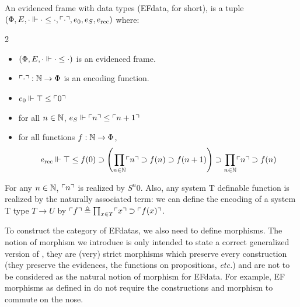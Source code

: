 \documentclass[a4paper,UKenglish,cleveref, autoref, thm-restate]{lipics-v2021}
\begin{document}
\begin{definition}
  An evidenced frame with data types (EFdata, for short),
  is a tuple $(\Phi,E,\cdot \Vdash \cdot \leq \cdot, \ulcorner\cdot\urcorner, e_0, e_S, e_{\mathrm{rec}})$ where:\vspace{-1em}
  \begin{multicols}{2}
  \begin{itemize}
  \item $(\Phi,E,\cdot \Vdash \cdot \leq \cdot)$ is an evidenced frame.
  \item $\ulcorner\cdot\urcorner : \mathbb N \to \Phi$ is an encoding function. 
  \item $e_0 \Vdash \top \leq \ulcorner0\urcorner$
  \item for all $n \in \mathbb N$, $e_S \Vdash \ulcorner n\urcorner \leq \ulcorner n + 1\urcorner$
  \end{itemize}
  \end{multicols}
  \vspace{-1.2em}
  \begin{itemize}
     \item for all functions $f : \mathbb N \to \Phi$,
    \[e_{\mathrm{rec}} \Vdash \top \leq f(0) \supset \left(\prod_{n \in \mathbb N}\ulcorner n\urcorner \supset f(n) \supset f(n+1)\right) \supset \prod_{n \in \mathbb N} \ulcorner n\urcorner \supset f(n)\]
  
  \end{itemize}
\end{definition}

\begin{remark}
  For any $n \in \mathbb N$, $\ulcorner n\urcorner$ is realized by $S^n 0$. Also, any system T definable function is realized by the naturally associated term: we can define the encoding of a system T type $T \to U$ by $\ulcorner f\urcorner \triangleq \prod_{x \in T} \ulcorner x\urcorner \supset \ulcorner f(x)\urcorner$.
\end{remark}

To construct the category of EFdatas, we also need to define morphisms.
The notion of morphism we introduce is only intended to state a correct generalized version
of , they are (very) strict morphisms which preserve every construction
(they preserve the evidences, the functions on propositions, \textit{etc.})
and are not to be considered as the natural notion of morphism for EFdata.
For example, EF morphisms as defined in \cite{CohMiqTat21} do not require
the constructions and morphism to commute on the nose.
\end{document}

